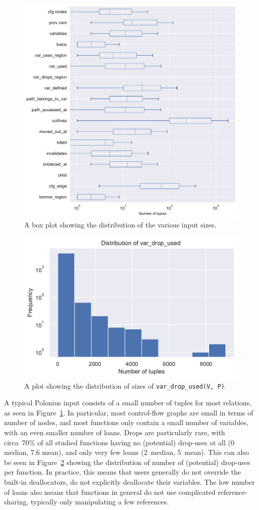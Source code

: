 \documentclass[11pt,a4paper,twoside,openany,draft]{report}
\newcommand{\InDatalog}[1]{\texttt{#1}}
\begin{document}
\begin{figure}
  \includegraphics[width=0.9\linewidth]{Graphs/input_sizes_boxplot.pdf}
  \caption[Distribution of Polonius Input Tuple Sizes]{A box plot showing the
    distribution of the various input sizes.}\label{fig:input-sizes}
\end{figure}

\begin{figure}
  \includegraphics[width=0.5\linewidth]{Graphs/var_drop_used_size_dist.pdf}
  \caption[Distribution of Input Sizes for the \InDatalog{var_drop_used(V, P)}
  Fact]{A plot showing the distribution of sizes of \InDatalog{var_drop_used(V,
      P)}.}\label{fig:input-var-drop-used}
\end{figure}

A typical Polonius input consists of a small number of tuples for most
relations, as seen in Figure~\ref{fig:input-sizes}. In particular, most
control-flow graphs are small in terms of number of nodes, and most functions
only contain a small number of variables, with an even smaller number of loans.
Drops are particularly rare, with circa~70\% of all studied functions having
no (potential) drop-uses at all (0 median, 7.6 mean), and only very few
loans (2~median, 5~mean). This can also be seen in
Figure~\ref{fig:input-var-drop-used} showing the distribution of number of
(potential) drop-uses per function. In practice, this means that users generally
do not override the built-in deallocators, do not explicitly deallocate their
variables. The low number of loans also means that functions in general do not
use complicated reference-sharing, typically only manipulating a few references.
\end{document}
